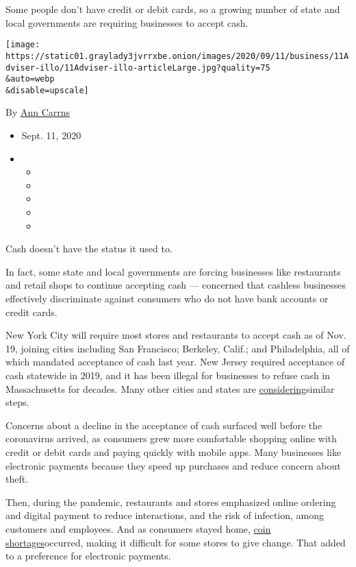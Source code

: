 Some people don't have credit or debit cards, so a growing number of
state and local governments are requiring businesses to accept cash.

\texttt{[image: https://static01.graylady3jvrrxbe.onion/images/2020/09/11/business/11Adviser-illo/11Adviser-illo-articleLarge.jpg?quality=75\\\&auto=webp\\\&disable=upscale]}

By \href{https://www.nytimes3xbfgragh.onion/by/ann-carrns}{Ann Carrns}

\begin{itemize}
\item
  Sept. 11, 2020
\item
  \begin{itemize}
  \item
  \item
  \item
  \item
  \item
  \end{itemize}
\end{itemize}

Cash doesn't have the status it used to.

In fact, some state and local governments are forcing businesses like
restaurants and retail shops to continue accepting cash --- concerned
that cashless businesses effectively discriminate against consumers who
do not have bank accounts or credit cards.

New York City will require most stores and restaurants to accept cash as
of Nov. 19, joining cities including San Francisco; Berkeley, Calif.;
and Philadelphia, all of which mandated acceptance of cash last year.
New Jersey required acceptance of cash statewide in 2019, and it has
been illegal for businesses to refuse cash in Massachusetts for decades.
Many other cities and states are
\href{https://www.capradio.org/articles/2020/05/12/as-more-california-businesses-go-cashless-during-pandemic-lawmaker-continues-push-to-ban-the-practice/}{considering}similar
steps.

Concerns about a decline in the acceptance of cash surfaced well before
the coronavirus arrived, as consumers grew more comfortable shopping
online with credit or debit cards and paying quickly with mobile apps.
Many businesses like electronic payments because they speed up purchases
and reduce concern about theft.

Then, during the pandemic, restaurants and stores emphasized online
ordering and digital payment to reduce interactions, and the risk of
infection, among customers and employees. And as consumers stayed home,
\href{https://www.nytimes3xbfgragh.onion/2020/06/25/business/economy/coin-shortage-coronavirus.html}{coin
shortages}occurred, making it difficult for some stores to give change.
That added to a preference for electronic payments.

